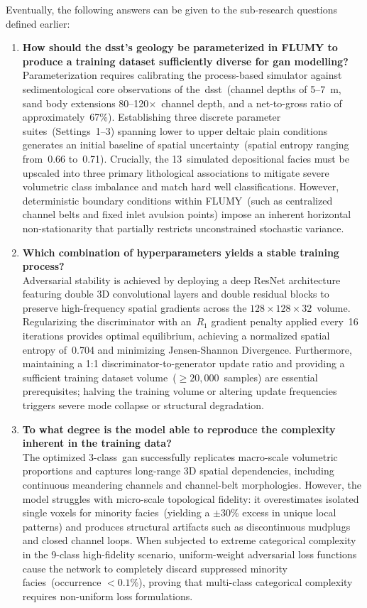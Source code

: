 Eventually, the following answers can be given to the sub-research questions defined earlier:
\begin{enumerate}
    \item \textbf{How should the \gls{dsst}’s geology be parameterized in FLUMY to produce a training dataset sufficiently diverse for \gls{gan} modelling?} \\
    Parameterization requires calibrating the process-based simulator against sedimentological core observations of the~\gls{dsst}~(channel depths of 5--7~m, sand body extensions 80--120$\times$~channel depth, and a net-to-gross ratio of approximately~67\%). Establishing three discrete parameter suites~(Settings~1--3) spanning lower to upper deltaic plain conditions generates an initial baseline of spatial uncertainty~(spatial entropy ranging from~0.66 to~0.71). Crucially, the 13~simulated depositional facies must be upscaled into three primary lithological associations to mitigate severe volumetric class imbalance and match hard well classifications. However, deterministic boundary conditions within FLUMY~(such as centralized channel belts and fixed inlet avulsion points) impose an inherent horizontal non-stationarity that partially restricts unconstrained stochastic variance.
    
    \item \textbf{Which combination of hyperparameters yields a stable training process?} \\
    Adversarial stability is achieved by deploying a deep ResNet architecture featuring double 3D convolutional layers and double residual blocks to preserve high-frequency spatial gradients across the $128 \times 128 \times 32$~volume. Regularizing the discriminator with an~$R_1$ gradient penalty applied every~16 iterations provides optimal equilibrium, achieving a normalized spatial entropy of~0.704 and minimizing Jensen-Shannon Divergence. Furthermore, maintaining a 1:1 discriminator-to-generator update ratio and providing a sufficient training dataset volume~($\ge 20,000$~samples) are essential prerequisites; halving the training volume or altering update frequencies triggers severe mode collapse or structural degradation.
    
    \item \textbf{To what degree is the model able to reproduce the complexity inherent in the training data?} \\
    The optimized 3-class~\gls{gan} successfully replicates macro-scale volumetric proportions and captures long-range 3D spatial dependencies, including continuous meandering channels and channel-belt morphologies. However, the model struggles with micro-scale topological fidelity: it overestimates isolated single voxels for minority facies~(yielding a $\pm 30$\% excess in unique local patterns) and produces structural artifacts such as discontinuous mudplugs and closed channel loops. When subjected to extreme categorical complexity in the 9-class high-fidelity scenario, uniform-weight adversarial loss functions cause the network to completely discard suppressed minority facies~(occurrence $<0.1$\%), proving that multi-class categorical complexity requires non-uniform loss formulations.
    

\end{enumerate}

